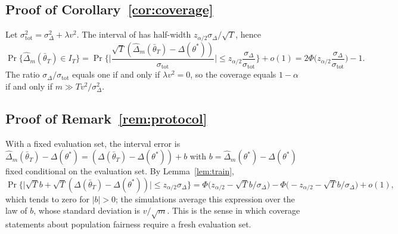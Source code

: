 \documentclass[pdflatex,sn-basic]{sn-jnl}
\newcommand{\dhat}{\hat\Delta}
\newcommand{\tbar}{\bar\theta}
\begin{document}
\subsection{Proof of Corollary~\ref{cor:coverage}}
Let $\sigma_{\mathrm{tot}}^2=\sigma^2_\Delta+\lambda v^2$.  The interval of \citet{roy2026uq} has
half-width $z_{\alpha/2}\sigma_\Delta/\sqrt T$, hence
\[
\Pr\{\dhat_m(\tbar_T)\in I_T\}
=\Pr\Big\{\Big|\frac{\sqrt T(\dhat_m(\tbar_T)-\Delta(\theta^*))}{\sigma_{\mathrm{tot}}}\Big|
\le z_{\alpha/2}\frac{\sigma_\Delta}{\sigma_{\mathrm{tot}}}\Big\}+o(1)
=2\Phi\Big(z_{\alpha/2}\frac{\sigma_\Delta}{\sigma_{\mathrm{tot}}}\Big)-1 .
\]
The ratio $\sigma_\Delta/\sigma_{\mathrm{tot}}$ equals one if and only if $\lambda v^2=0$, so the
coverage equals $1-\alpha$ if and only if $m\gg Tv^2/\sigma^2_\Delta$.

\subsection{Proof of Remark~\ref{rem:protocol}}
With a fixed evaluation set, the interval error is
$\dhat_m(\tbar_T)-\Delta(\theta^*)=(\Delta(\tbar_T)-\Delta(\theta^*))+b$ with
$b=\dhat_m(\theta^*)-\Delta(\theta^*)$ fixed conditional on the evaluation set.  By
Lemma~\ref{lem:train},
\[
\Pr\Big\{\big|\sqrt T b+\sqrt T(\Delta(\tbar_T)-\Delta(\theta^*))\big|\le z_{\alpha/2}\sigma_\Delta\Big\}
=\Phi\big(z_{\alpha/2}-\sqrt T b/\sigma_\Delta\big)-\Phi\big(-z_{\alpha/2}-\sqrt T b/\sigma_\Delta\big)+o(1),
\]
which tends to zero for $|b|>0$; the simulations average this expression over the law of $b$, whose
standard deviation is $v/\sqrt m$.  This is the sense in which coverage statements about population
fairness require a fresh evaluation set.
\end{document}
